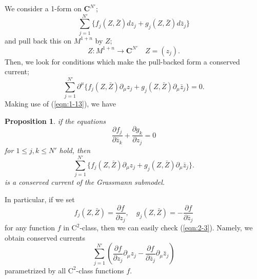 \documentclass[makeidx,12pt,openany]{report}
\newtheorem{prop}[df]{Proposition}
\begin{document}
We consider a 1-form on ${\mathbf{C}}^{N'}$;
\begin{equation}
 \sum_{j=1}^{N'} \{f_j (Z,\bar{Z})dz_j + g_j (Z,\bar{Z})d\bar{z}_j \}
\end{equation}
and pull back this on $M^{1+n}$ by $Z$;
$$
 Z:M^{1+n} \longrightarrow {\mathbf{C}}^{N'} \quad Z=(z_j).
$$
Then, we look for conditions which make the pull-backed form 
a conserved current;
\begin{equation}
 \sum_{j=1}^{N'} \partial^{\mu}
  \{f_j (Z,\bar{Z})\partial_{\mu}z_j 
  + g_j (Z,\bar{Z})\partial_{\mu}\bar{z}_j \} =0.
\end{equation}
Making use of (\ref{eqn:1-13}), we have
\begin{prop}\label{prop:multiplier}
if the equations
\begin{equation}
 \frac{\partial f_j}{\partial \bar{z}_k}
 +\frac{\partial g_k}{\partial z_j}=0
 \label{eqn:2-3}
\end{equation}
for $1 \le j,k \le {N'}$ hold, then
\begin{equation}
 \sum_{j=1}^{N'} 
  \{f_j (Z,\bar{Z})\partial_{\mu}z_j 
  + g_j (Z,\bar{Z})\partial_{\mu}\bar{z}_j \} .
  \label{eqn:pullbackcurr}
\end{equation}
is a conserved current of the Grassmann submodel.
\end{prop}
In particular, if we set
\begin{equation}
 f_j (Z,\bar{Z})=\frac{\partial f}{\partial z_j}, \quad
 g_j (Z,\bar{Z})=-\frac{\partial f}{\partial \bar{z}_j}
\end{equation}
for any function $f$ in $\mbox{C}^2$-class, then we can easily check (\ref{eqn:2-3}). Namely, we obtain conserved currents
\begin{equation}
 \sum_{j=1}^{N'} 
  \left( \frac{\partial f}{\partial z_j}\partial_{\mu}z_j 
   -\frac{\partial f}{\partial \bar{z}_j}\partial_{\mu}\bar{z}_j \right) 
  \label{eqn:GraCurr}
\end{equation}
parametrized by all $\mbox{C}^2$-class functions $f$. 
\end{document}
